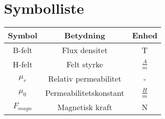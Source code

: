 \section{Symbolliste}

\begin{tabular}{|c|c|c|}
\hline 
Symbol & Betydning & Enhed \\ 
\hline 
B-felt & Flux densitet & T \\ 
\hline 
H-felt & Felt styrke & $\frac{A}{m}$\\
\hline 
$\mu_{r}$ & Relativ permeabilitet & - \\
\hline 
$\mu_{0}$ & Permeabilitetskonstant & $\frac{H}{m}$\\
\hline 
$F_{magn}$ & Magnetisk kraft & N \\
\hline

\end{tabular} 
